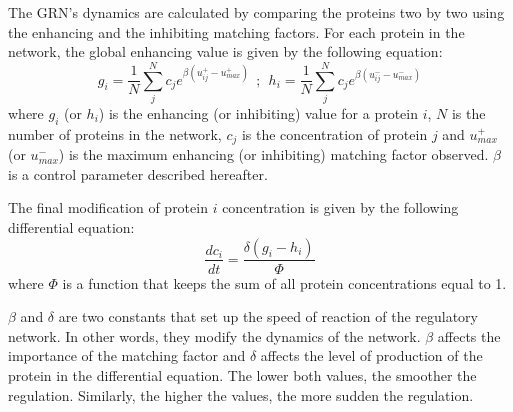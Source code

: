 The GRN's dynamics are calculated by comparing the proteins two by two using the
enhancing and the inhibiting matching factors. For each protein in the network,
the global enhancing value is given by the following equation:
\begin{equation}
g_i=\frac{1}{N}\sum_j^N{c_je^{\beta (u^{+}_{ij}-u_{max}^{+})}}~~;~~h_i=\frac{1}{N}\sum_j^N{c_je^{\beta (u^{-}_{ij}-u_{max}^{-})}}
\end{equation}
where $g_i$ (or $h_i$) is the enhancing (or inhibiting) value for a
protein $i$, $N$ is the number of proteins in the network, $c_j$ is the
concentration of protein $j$ and $u_{max}^{+}$ (or $u_{max}^{-}$) is the
maximum enhancing (or inhibiting) matching factor observed. $\beta$ is a
control parameter described hereafter.

The final modification of protein $i$ concentration is given by the following
differential equation:
\begin{equation}
\frac{dc_i}{dt}=\frac{\delta(g_i-h_i)}{\Phi}
\end{equation}
where $\Phi$ is a function that keeps the sum of all protein concentrations
equal to 1.

$\beta$ and $\delta$ are two constants that set up the speed of reaction of the
regulatory network. In other words, they modify the dynamics of the network. $\beta$
affects the importance of the matching factor and $\delta$ affects the level of
production of the protein in the differential equation. The lower both values,
the smoother the regulation. Similarly, the higher the values, the more sudden
the regulation. 
